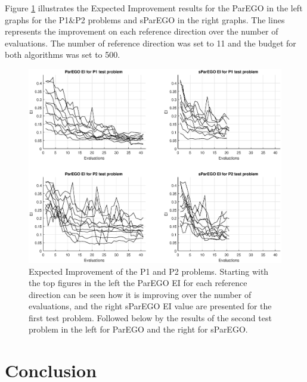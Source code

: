 \documentclass[10pt]{llncs}
\begin{document}
Figure \ref{fig:EI} illustrates the Expected Improvement results for the ParEGO in the left graphs for the P1$\&$P2  problems  and sParEGO in the right graphs. The lines represents the improvement on each reference direction over the number of evaluations. The number of reference direction was set to 11 and the budget for both algorithms was set to 500. 

\begin{figure}
\begin{center}
\includegraphics[scale=0.45, center]{EI}
\end{center}
\caption{Expected Improvement of the P1 and P2 problems. Starting with the top figures in the left the ParEGO EI for each reference direction can be seen how it is improving over the number of evaluations, and the right sParEGO EI value are presented for the first test problem. Followed below by the results of the second test problem in the left for ParEGO and the right for sParEGO.}
\label{fig:EI}
\end{figure}





\section{Conclusion}
\label{sec:conclusion}
\end{document}
